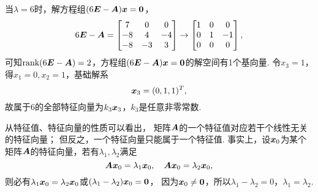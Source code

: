 \begin{example}
\begin{solution}
当\(\lambda=6\)时，解方程组\((6\boldsymbol{E}-\boldsymbol{A})\boldsymbol{x} = \boldsymbol0\)，\begin{equation*}
	6\boldsymbol{E}-\boldsymbol{A} = \begin{bmatrix}
		7 & 0 & 0 \\
		-8 & 4 & -4 \\
		-8 & -3 & 3
	\end{bmatrix} \to \begin{bmatrix}
		1 & 0 & 0 \\
		0 & 1 & -1 \\
		0 & 0 & 0
	\end{bmatrix},
\end{equation*}
可知\(\rank(6\boldsymbol{E}-\boldsymbol{A}) = 2\)，方程组\((6\boldsymbol{E}-\boldsymbol{A})\boldsymbol{x} = \boldsymbol0\)的解空间有1个基向量.
令\(x_3 = 1\)，得\(x_1 = 0, x_2 = 1\)，基础解系\begin{equation*}
	\boldsymbol{x}_3 = (0,1,1)^T,
\end{equation*}
故属于\(6\)的全部特征向量为\(k_3 \boldsymbol{x}_3\)，\(k_3\)是任意非零常数.
\end{solution}
\end{example}

从特征值、特征向量的性质可以看出，
矩阵\(\boldsymbol{A}\)的一个特征值对应若干个线性无关的特征向量；
但反之，一个特征向量只能属于一个特征值.
事实上，设\(\boldsymbol{x}_0\)为某个矩阵\(\boldsymbol{A}\)的特征向量，若有\(\lambda_1,\lambda_2\)满足\begin{equation*}
	\boldsymbol{A}\boldsymbol{x}_0=\lambda_1\boldsymbol{x}_0,
	\quad
	\boldsymbol{A}\boldsymbol{x}_0=\lambda_2\boldsymbol{x}_0,
\end{equation*}
则必有\(\lambda_1\boldsymbol{x}_0=\lambda_2\boldsymbol{x}_0\)或\((\lambda_1-\lambda_2)\boldsymbol{x}_0=\boldsymbol0\)，
因为\(\boldsymbol{x}_0\neq\boldsymbol0\)，所以\(\lambda_1-\lambda_2=0\)，\(\lambda_1=\lambda_2\).

